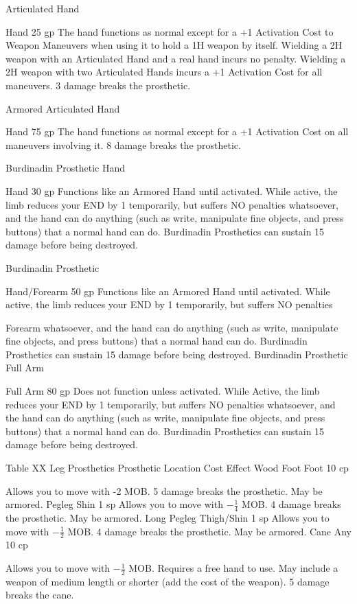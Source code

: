 \documentclass[oneside,11pt,english]{book}
\begin{document}
Articulated 
Hand 

Hand 25 gp The hand functions as normal except for a +1 Activation Cost to 
Weapon Maneuvers when using it to hold a 1H weapon by itself. 
Wielding a 2H weapon with an Articulated Hand and a real hand 
incurs no penalty. Wielding a 2H weapon with two Articulated Hands 
incurs a +1 Activation Cost for all maneuvers. 3 damage breaks the 
prosthetic. 

Armored 
Articulated 
Hand 

Hand 75 gp The hand functions as normal except for a +1 Activation Cost on all 
maneuvers involving it. 8 damage breaks the prosthetic. 

Burdinadin 
Prosthetic 
Hand 

Hand 30 gp Functions like an Armored Hand until activated. While active, the 
limb reduces your END by 1 temporarily, but suffers NO penalties 
whatsoever, and the hand can do anything (such as write, manipulate 
fine objects, and press buttons) that a normal hand can do. Burdinadin 
Prosthetics can sustain 15 damage before being destroyed. 

Burdinadin 
Prosthetic 

Hand/Forearm 50 gp Functions like an Armored Hand until activated. While active, the 
limb reduces your END by 1 temporarily, but suffers NO penalties 


Forearm whatsoever, and the hand can do anything (such as write, manipulate 
fine objects, and press buttons) that a normal hand can do. Burdinadin 
Prosthetics can sustain 15 damage before being destroyed. 
Burdinadin 
Prosthetic Full 
Arm 

Full Arm 80 gp Does not function unless activated. While Active, the limb reduces 
your END by 1 temporarily, but suffers NO penalties whatsoever, and 
the hand can do anything (such as write, manipulate fine objects, and 
press buttons) that a normal hand can do. Burdinadin Prosthetics can 
sustain 15 damage before being destroyed. 

 
Table XX Leg Prosthetics 
Prosthetic Location Cost Effect 
Wood Foot Foot 10 
cp 

Allows you to move with -2 MOB. 5 damage breaks the prosthetic. 
May be armored. 
Pegleg Shin 1 sp Allows you to move with $ -\frac{1}{4} $ MOB. 4 damage breaks the prosthetic. 
May be armored. 
Long Pegleg Thigh/Shin 1 sp Allows you to move with $ -\frac{1}{2} $ MOB. 4 damage breaks the prosthetic. 
May be armored. 
Cane Any 10 
cp 

Allows you to move with $ -\frac{1}{2} $ MOB. Requires a free hand to use. May 
include a weapon of medium length or shorter (add the cost of the 
weapon). 5 damage breaks the cane. 
\end{document}

